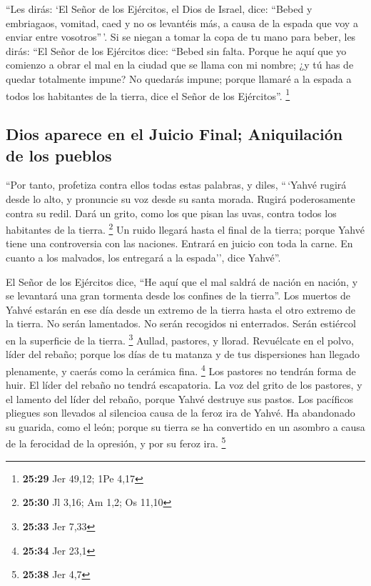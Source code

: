  ``Les dirás: `El Señor de los Ejércitos, el Dios de
Israel, dice: ``Bebed y embriagaos, vomitad, caed y no os levantéis más,
a causa de la espada que voy a enviar entre vosotros''\,'.
 Si se niegan a tomar la copa de tu mano para beber, les
dirás: ``El Señor de los Ejércitos dice: ``Bebed sin falta.
 Porque he aquí que yo comienzo a obrar el mal en la
ciudad que se llama con mi nombre; ¿y tú has de quedar totalmente
impune? No quedarás impune; porque llamaré a la espada a todos los
habitantes de la tierra, dice el Señor de los Ejércitos''. \footnote{\textbf{25:29}
  Jer 49,12; 1Pe 4,17}

\hypertarget{dios-aparece-en-el-juicio-final-aniquilaciuxf3n-de-los-pueblos}{%
\subsection{Dios aparece en el Juicio Final; Aniquilación de los
pueblos}\label{dios-aparece-en-el-juicio-final-aniquilaciuxf3n-de-los-pueblos}}

 ``Por tanto, profetiza contra ellos todas estas
palabras, y diles, ``\,`Yahvé rugirá desde lo alto, y pronuncie su voz
desde su santa morada. Rugirá poderosamente contra su redil. Dará un
grito, como los que pisan las uvas, contra todos los habitantes de la
tierra. \footnote{\textbf{25:30} Jl 3,16; Am 1,2; Os 11,10}
 Un ruido llegará hasta el final de la tierra; porque
Yahvé tiene una controversia con las naciones. Entrará en juicio con
toda la carne. En cuanto a los malvados, los entregará a la espada'',
dice Yahvé''.

 El Señor de los Ejércitos dice, ``He aquí que el mal
saldrá de nación en nación, y se levantará una gran tormenta desde los
confines de la tierra''.  Los muertos de Yahvé estarán en
ese día desde un extremo de la tierra hasta el otro extremo de la
tierra. No serán lamentados. No serán recogidos ni enterrados. Serán
estiércol en la superficie de la tierra. \footnote{\textbf{25:33} Jer
  7,33}  Aullad, pastores, y llorad. Revuélcate en el
polvo, líder del rebaño; porque los días de tu matanza y de tus
dispersiones han llegado plenamente, y caerás como la cerámica fina.
\footnote{\textbf{25:34} Jer 23,1}  Los pastores no
tendrán forma de huir. El líder del rebaño no tendrá escapatoria.
 La voz del grito de los pastores, y el lamento del líder
del rebaño, porque Yahvé destruye sus pastos.  Los
pacíficos pliegues son llevados al silencioa causa de la feroz ira de
Yahvé.  Ha abandonado su guarida, como el león; porque su
tierra se ha convertido en un asombro a causa de la ferocidad de la
opresión, y por su feroz ira. \footnote{\textbf{25:38} Jer 4,7}


